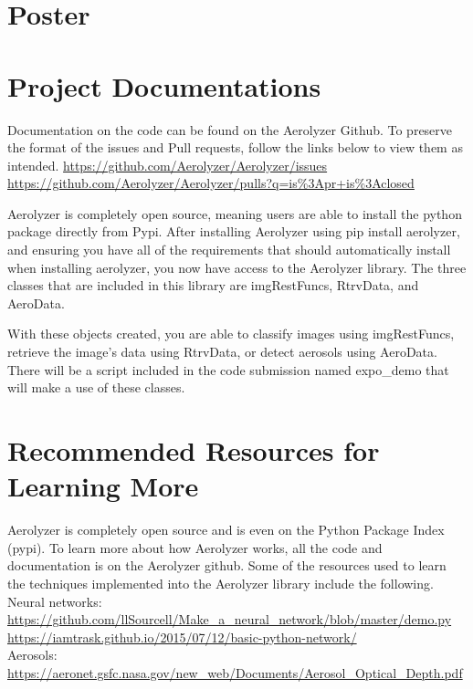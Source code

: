 \documentclass[onecolumn, draftclsnofoot,10pt, compsoc]{IEEEtran}
\begin{document}
\begin{singlespace}
\begin{longtable}{|l|p{0.3\linewidth}|p{0.3\linewidth}|p{0.3\linewidth}|}
			\end{longtable}
	\section{Poster}
		
	\section{Project Documentations}
		Documentation on the code can be found on the Aerolyzer Github.
		To preserve the format of the issues and Pull requests, follow the links below to view them as intended.
		\url{https://github.com/Aerolyzer/Aerolyzer/issues}
		\url{https://github.com/Aerolyzer/Aerolyzer/pulls?q=is%3Apr+is%3Aclosed}
		
		Aerolyzer is completely open source, meaning users are able to install the python package directly from Pypi.
		After installing Aerolyzer using pip install aerolyzer, and ensuring you have all of the requirements that should automatically install when installing aerolyzer, you now have access to the Aerolyzer library.
		The three classes that are included in this library are imgRestFuncs, RtrvData, and AeroData.
		
		With these objects created, you are able to classify images using imgRestFuncs, retrieve the image's data using RtrvData, or detect aerosols using AeroData.
		There will be a script included in the code submission named expo\_demo that will make a use of these classes.
	\section{Recommended Resources for Learning More}
		Aerolyzer is completely open source and is even on the Python Package Index (pypi).
		To learn more about how Aerolyzer works, all the code and documentation is on the Aerolyzer github.
		Some of the resources used to learn the techniques implemented into the Aerolyzer library include the following.
		Neural networks:\\
		\url{https://github.com/llSourcell/Make_a_neural_network/blob/master/demo.py} \\
		\url{https://iamtrask.github.io/2015/07/12/basic-python-network/} \\

		Aerosols:\\
		\url{https://aeronet.gsfc.nasa.gov/new_web/Documents/Aerosol_Optical_Depth.pdf} \\


\end{singlespace}
\end{document}
